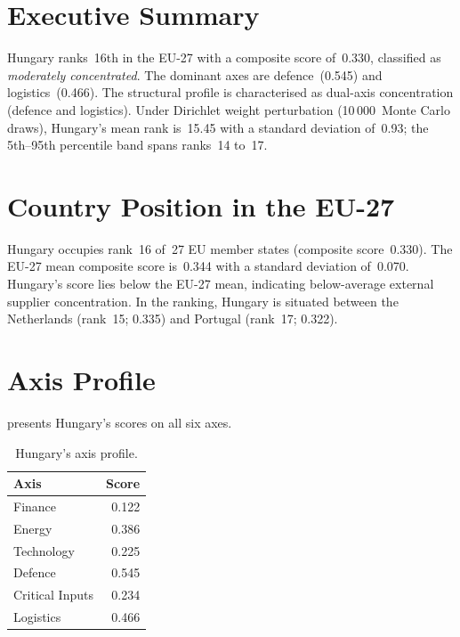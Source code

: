 \documentclass[12pt,a4paper]{article}
\begin{document}
\hypersetup{pageanchor=true}
\pagestyle{fancy}
\renewcommand{\headrulewidth}{0.4pt}


\section{Executive Summary}
\label{sec:summary}

Hungary ranks~16th in the EU-27 with a composite \ISI score of~0.330, classified as \emph{moderately concentrated}.  The dominant axes are defence~(0.545) and logistics~(0.466).  The structural profile is characterised as dual-axis concentration (defence and logistics).  Under Dirichlet weight perturbation (10\,000~Monte Carlo draws), Hungary's mean rank is~15.45 with a standard deviation of~0.93; the 5th--95th percentile band spans ranks~14 to~17.


\section{Country Position in the EU-27}
\label{sec:position}

Hungary occupies rank~16 of~27 EU member states (composite score~0.330).  The EU-27 mean composite score is~0.344 with a standard deviation of~0.070.  Hungary's score lies below the EU-27 mean, indicating below-average external supplier concentration.  In the ranking, Hungary is situated between the Netherlands (rank~15; 0.335) and Portugal (rank~17; 0.322).


\section{Axis Profile}
\label{sec:axis-profile}

 presents Hungary's scores on all six \ISI axes.

\begin{table}[htbp]
\centering\small
\caption{Hungary's \ISI axis profile.}
\label{tab:axis-profile}
\begin{tabular}{@{}lr@{}}
\toprule
\textbf{Axis} & \textbf{Score} \\
\midrule
    Finance           & 0.122 \\
    Energy            & 0.386 \\
    Technology        & 0.225 \\
    Defence           & 0.545 \\
    Critical Inputs   & 0.234 \\
    Logistics         & 0.466 \\
\bottomrule
\end{tabular}
\end{table}
\end{document}
